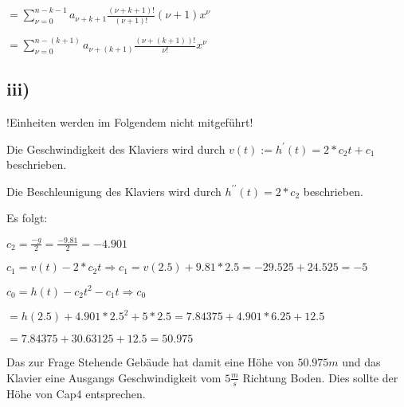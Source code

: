 $ = \sum\limits^{n-k-1}_{\nu=0} a_{\nu+k+1} \frac{(\nu+k+1)!}{(\nu+1)!} (\nu+1)x^{\nu}$

$ = \sum\limits^{n -(k+1)}_{\nu=0} a_{\nu+(k+1)} \frac{(\nu+(k+1))!}{\nu!} x^{\nu}$


\pagebreak
\subsection*{iii)}

\begin{large}
!Einheiten werden im Folgendem nicht mitgeführt!
\end{large}

Die Geschwindigkeit des Klaviers wird durch $v(t) := h^{\prime}(t) = 2 * c_{2}t + c_{1}$ beschrieben.

Die Beschleunigung des Klaviers wird durch $h^{\prime\prime}(t) = 2 * c_{2}$ beschrieben.

Es folgt:

$c_{2} = \frac{-g}{2} = \frac{-9.81}{2} = -4.901 $

$c_{1} = v(t) - 2*c_{2}t \Longrightarrow c_{1} = v(2.5) + 9.81*2.5 = -29.525 + 24.525 = -5$

$c_{0} = h(t) - c_{2}t^{2} - c_{1}t \Longrightarrow c_{0}$

$= h(2.5) + 4.901 * 2.5^{2} + 5 * 2.5 = 7.84375 + 4.901 * 6.25 + 12.5$
 
$ = 7.84375 + 30.63125 + 12.5 = 50.975$

Das zur Frage Stehende Gebäude hat damit eine Höhe von $50.975m$ und das Klavier eine Ausgangs Geschwindigkeit vom $5\frac{m}{s}$ Richtung Boden.
Dies sollte der Höhe von Cap4 entsprechen.
       
 